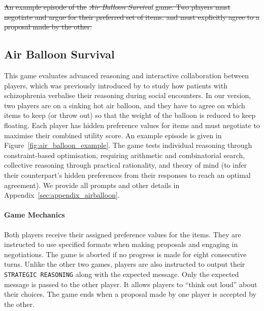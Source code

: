 \documentclass[11pt]{article}
\providecommand{\DIFdel}[1]{{\protect\color{red}\sout{#1}}}                      %
\providecommand{\DIFdelbegin}{} %
\providecommand{\DIFdelend}{} %
\providecommand{\DIFdelFL}[1]{\DIFdel{#1}} %
\newcommand{\DIFscaledelfig}{0.5}
\newlength{\DIFdelgraphicswidth} %
\newlength{\DIFdelgraphicsheight} %
\newcommand{\DIFdelincludegraphics}[2][]{%
\sbox{\DIFdelgraphicsbox}{\DIFOincludegraphics[#1]{#2}}%
\settoboxwidth{\DIFdelgraphicswidth}{\DIFdelgraphicsbox} %
\settoboxtotalheight{\DIFdelgraphicsheight}{\DIFdelgraphicsbox} %
\scalebox{\DIFscaledelfig}{%
\parbox[b]{\DIFdelgraphicswidth}{\usebox{\DIFdelgraphicsbox}\\[-\baselineskip] \rule{\DIFdelgraphicswidth}{0em}}\llap{\resizebox{\DIFdelgraphicswidth}{\DIFdelgraphicsheight}{%
\setlength{\unitlength}{\DIFdelgraphicswidth}%
\begin{picture}(1,1)%
\thicklines\linethickness{2pt} %
{\color[rgb]{1,0,0}\put(0,0){\framebox(1,1){}}}%
{\color[rgb]{1,0,0}\put(0,0){\line( 1,1){1}}}%
{\color[rgb]{1,0,0}\put(0,1){\line(1,-1){1}}}%
\end{picture}%
}\hspace*{3pt}}} %
} %
\DeclareRobustCommand{\DIFdelbegin}{\DIFOdelbegin \let\includegraphics\DIFdelincludegraphics} %
\DeclareRobustCommand{\DIFdelend}{\DIFOaddend \let\includegraphics\DIFOincludegraphics} %
\begin{document}
\DIFdelbegin %
{%
\DIFdelFL{An example episode of the }\textit{\DIFdelFL{Air Balloon Survival}} %
\DIFdelFL{game. Two players must negotiate and argue for their preferred set of items. and must explicitly agree to a proposal made by the other.}}

\DIFdelend \subsection{Air Balloon Survival}
This game evaluates advanced reasoning and interactive collaboration between players, which was previously introduced by \citet{howes2021justifiable} to study how patients with schizophrenia verbalise their reasoning during social encounters. In our version, two players are on a sinking hot air balloon, and they have to agree on which items to keep (or throw out) so that the weight of the balloon is reduced to keep floating. Each player has hidden preference values for items and must negotiate to maximise their combined utility score. An example episode is given in Figure~\ref{fig:air_balloon_example}. The game tests individual reasoning through constraint-based optimisation, requiring arithmetic and combinatorial search, collective reasoning through practical rationality, and theory of mind (to infer their counterpart's hidden preferences from their responses to reach an optimal agreement). We provide all prompts and other details in Appendix~\ref{sec:appendix_airballoon}.


\paragraph{Game Mechanics}
Both players receive their assigned preference values for the items. They are instructed to use specified formats when making proposals and engaging in negotiations. The game is aborted if no progress is made for eight consecutive turns. 
Unlike the other two games, players are also instructed to output their \texttt{STRATEGIC REASONING} along with the expected message. Only the expected message is passed to the other player. It allows players to ``think out loud'' about their choices. The game ends when a proposal made by one player is accepted by the other.
\end{document}
